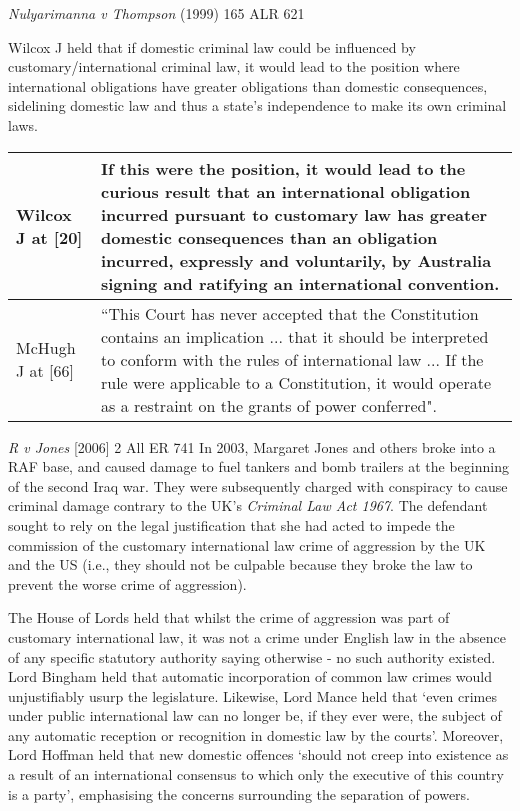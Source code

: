 \begin{casedetails}{\textit{Nulyarimanna v Thompson} (1999) 165 ALR 621}
    \vspace{\baselineskip}

    Wilcox J held that if domestic criminal law could be influenced by customary/international criminal law, it would lead to the position where international obligations have greater obligations than domestic consequences, sidelining domestic law and thus a state's independence to make its own criminal laws.

    \begin{longtable}{p{}|>{\raggedright\arraybackslash}p{}}
        Wilcox J at [20] & If this were the position, it would lead to the curious result that an international obligation incurred pursuant to customary law has greater domestic consequences than an obligation incurred, expressly and voluntarily, by Australia signing and ratifying an international convention. \\[3cm]\hline
        McHugh J at [66] & ``This Court has never accepted that the Constitution contains an implication ... that it should be interpreted to conform with the rules of international law ... If the rule were applicable to a Constitution, it would operate as a restraint on the grants of power conferred".
    \end{longtable} 

    


\end{casedetails}

\begin{casedetails}{\textit{R v Jones} [2006] 2 All ER 741}\label{case: R v Jones}
    \flushleft
    In 2003, Margaret Jones and others broke into a RAF base, and caused damage to fuel tankers and bomb trailers at the beginning of the second Iraq war. They were subsequently charged with conspiracy to cause criminal damage contrary to the UK's \textit{Criminal Law Act 1967}. The defendant sought to rely on the legal justification that she had acted to impede the commission of the customary international law crime of aggression by the UK and the US (i.e., they should not be culpable because they broke the law to prevent the worse crime of aggression).

    \vspace{\baselineskip}

    The House of Lords held that whilst the crime of aggression was part of customary international law, it was not a crime under English law in the absence of any specific statutory authority saying otherwise - no such authority existed. Lord Bingham held that automatic incorporation of common law crimes would unjustifiably usurp the legislature. Likewise, Lord Mance held that `even crimes under public international law can no longer be, if they ever were, the subject of any automatic reception or recognition in domestic law by the courts'. Moreover, Lord Hoffman held that new domestic offences `should not creep into existence as a result of an international consensus to which only the executive of this country is a party', emphasising the concerns surrounding the separation of powers.
\end{casedetails}

